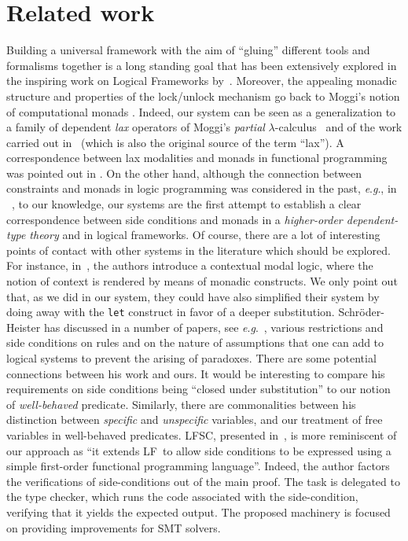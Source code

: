 \documentclass[submission,copyright,creativecommons]{eptcs}
\theoremstyle{plain}
\theoremstyle{definition}
\newcommand{\LF}  {\mbox{$\mathsf {LF}$}}
\newcommand {\eg}        {{\textit{e}.\textit{g}.}}
\def \LF	{\mbox {{\sf LF}}}
\begin{document}
\section{Related work}\label{sec:relwork}
Building a universal framework with the aim of ``gluing'' different
tools and formalisms together is a long standing goal that has been
extensively explored in the inspiring work on Logical Frameworks
by~\cite{BCKL-03,
  pfenning1999system,watkins-02,celf,LF-modulo,dedukti,NPP05:CMTT,Pientka08:DependentBeluga,belugasys,HLL06}. Moreover,
the appealing monadic structure and properties of the lock/unlock
mechanism go back to Moggi's notion of computational monads
\cite{Moggi-Computationallambda}. Indeed, our system can be seen as a
generalization to a family of dependent \emph{lax} operators of
Moggi's \emph{partial} $\lambda$-calculus~\cite{moggi1988partial} and
of the work carried out
in~\cite{fairtlough1997propositional,mendler1991constrained} (which is
also the original source of the term ``lax''). A correspondence
between lax modalities and monads in functional programming was
pointed out in \cite{alechina2001,garg2008indexed}.  On the other
hand, although the connection between constraints and monads in logic
programming was considered in the past, \eg, in
~\cite{NPP05:CMTT,Fairtlough97first-orderlax,fairtlough2001abstraction},
to our knowledge, our systems are the first attempt to establish a
clear correspondence between side conditions and monads in a
\emph{higher-order dependent-type theory} and in logical frameworks.
Of course, there are a lot of interesting points of contact with other
systems in the literature which should be explored. For instance,
in~\cite{NPP05:CMTT}, the authors introduce a contextual modal logic,
where the notion of context is rendered by means of monadic
constructs. We only point out that, as we did in our system,  they
could have also simplified their system by doing away with the {\tt let}
construct in favor of a deeper substitution.
Schr\"oder-Heister has discussed in a number of papers, see \eg\
\cite{schroeder2012proof,schroeder2012honour}, various restrictions
and side conditions on rules and on the nature of assumptions that one
can add to logical systems to prevent the arising of paradoxes. There
are some potential connections between his work and ours. It would be
interesting to compare his requirements on side conditions being
``closed under substitution'' to our notion of \emph{well-behaved}
predicate. Similarly, there are commonalities between his distinction
between \emph{specific} and \emph{unspecific} variables, and our
treatment of free variables in well-behaved predicates.  LFSC,
presented in~\cite{stump-08}, is more reminiscent of our approach as
``it extends \LF\ to allow side conditions to be expressed using a
simple first-order functional programming language''. Indeed, the
author factors the verifications of side-conditions out of the main
proof. The task is delegated to the type checker, which runs the code
associated with the side-condition, verifying that it yields the
expected output. The proposed machinery is focused on providing
improvements for SMT solvers.
\end{document}
